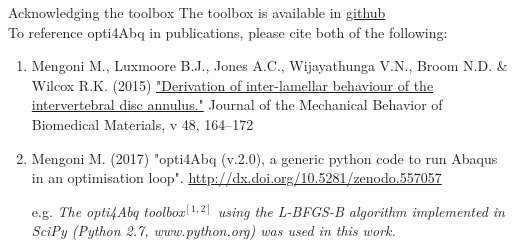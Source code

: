 \begin{frame}{Acknowledging the toolbox}
\vfill
The toolbox is available in \href{https://github.com/mengomarlene/opti4Abq}{github}\\[.5cm]
    
To reference opti4Abq in publications, please cite both of the following:
{\footnotesize
\begin{enumerate}
\item Mengoni M., Luxmoore B.J., Jones A.C., Wijayathunga V.N., Broom N.D. \& Wilcox R.K. (2015)
\href{http://dx.doi.org/10.1016/j.jmbbm.2015.03.028}{"Derivation of inter-lamellar behaviour of the intervertebral disc annulus."} Journal of the Mechanical Behavior of Biomedical Materials, v 48, 164–172

\item Mengoni M. (2017) "opti4Abq (v.2.0), a generic python code to run Abaqus in an optimisation loop". \url{http://dx.doi.org/10.5281/zenodo.557057}

\item[\color{black} e.g.]  {\it The opti4Abq toolbox$^{[1,2]}$ using the L-BFGS-B algorithm implemented in SciPy (Python 2.7, www.python.org) was used in this work.}
\end{enumerate}
}

\end{frame}